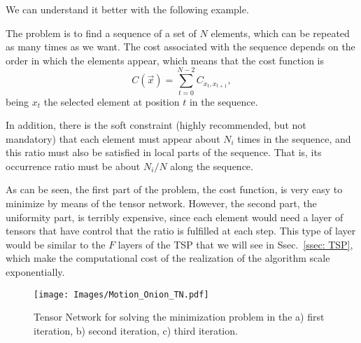 We can understand it better with the following example.

The problem is to find a sequence of a set of $N$ elements, which can be repeated as many times as we want. The cost associated with the sequence depends on the order in which the elements appear, which means that the cost function is
\begin{equation}
    C(\Vec{x})=\sum_{t=0}^{N-2} C_{x_t,x_{t+1}},
\end{equation}
being $x_t$ the selected element at position $t$ in the sequence.


In addition, there is the soft constraint (highly recommended, but not mandatory) that each element must appear about $N_i$ times in the sequence, and this ratio must also be satisfied in local parts of the sequence. That is, its occurrence ratio must be about $N_i/N$ along the sequence.


As can be seen, the first part of the problem, the cost function, is very easy to minimize by means of the tensor network. However, the second part, the uniformity part, is terribly expensive, since each element would need a layer of tensors that have control that the ratio is fulfilled at each step. This type of layer would be similar to the $F$ layers of the TSP that we will see in Ssec.~\ref{ssec: TSP}, which make the computational cost of the realization of the algorithm scale exponentially.

\begin{figure}
    \centering
    \texttt{[image: Images/Motion\_Onion\_TN.pdf]}
    \caption{Tensor Network for solving the minimization problem in the a) first iteration, b) second iteration, c) third iteration.}
    \label{fig: Motion Onion TN}
\end{figure}

